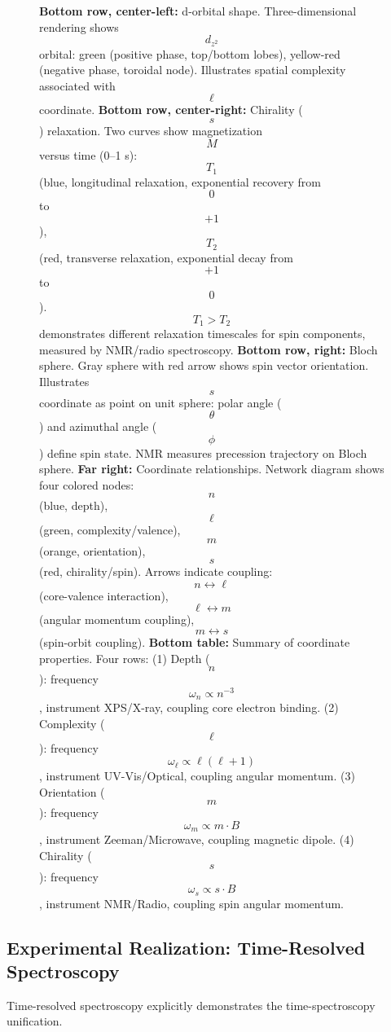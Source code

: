 \begin{figure}[htbp]
{    \textbf{Bottom row, center-left:} d-orbital shape. Three-dimensional rendering shows $$d_{z^2}$$ orbital: green (positive phase, top/bottom lobes), yellow-red (negative phase, toroidal node). Illustrates spatial complexity associated with $$\ell$$ coordinate. 
    \textbf{Bottom row, center-right:} Chirality ($$s$$) relaxation. Two curves show magnetization $$M$$ versus time (0--1 s): $$T_1$$ (blue, longitudinal relaxation, exponential recovery from $$0$$ to $$+1$$), $$T_2$$ (red, transverse relaxation, exponential decay from $$+1$$ to $$0$$). $$T_1 > T_2$$ demonstrates different relaxation timescales for spin components, measured by NMR/radio spectroscopy. 
    \textbf{Bottom row, right:} Bloch sphere. Gray sphere with red arrow shows spin vector orientation. Illustrates $$s$$ coordinate as point on unit sphere: polar angle ($$\theta$$) and azimuthal angle ($$\phi$$) define spin state. NMR measures precession trajectory on Bloch sphere. 
    \textbf{Far right:} Coordinate relationships. Network diagram shows four colored nodes: $$n$$ (blue, depth), $$\ell$$ (green, complexity/valence), $$m$$ (orange, orientation), $$s$$ (red, chirality/spin). Arrows indicate coupling: $$n \leftrightarrow \ell$$ (core-valence interaction), $$\ell \leftrightarrow m$$ (angular momentum coupling), $$m \leftrightarrow s$$ (spin-orbit coupling). 
    \textbf{Bottom table:} Summary of coordinate properties. Four rows: (1) Depth ($$n$$): frequency $$\omega_n \propto n^{-3}$$, instrument XPS/X-ray, coupling core electron binding. (2) Complexity ($$\ell$$): frequency $$\omega_\ell \propto \ell(\ell+1)$$, instrument UV-Vis/Optical, coupling angular momentum. (3) Orientation ($$m$$): frequency $$\omega_m \propto m \cdot B$$, instrument Zeeman/Microwave, coupling magnetic dipole. (4) Chirality ($$s$$): frequency $$\omega_s \propto s \cdot B$$, instrument NMR/Radio, coupling spin angular momentum.}
    \label{fig:unified_spectroscopy}
    \end{figure}

\subsection{Experimental Realization: Time-Resolved Spectroscopy}

Time-resolved spectroscopy explicitly demonstrates the time-spectroscopy unification.

